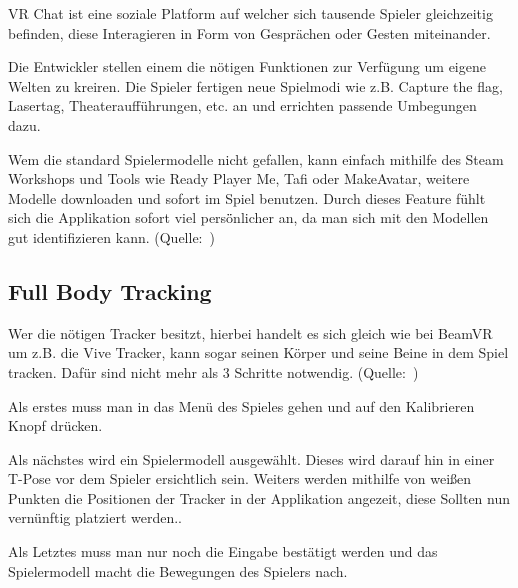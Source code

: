 VR Chat ist eine soziale Platform auf welcher sich tausende Spieler gleichzeitig befinden, diese Interagieren in Form von Gespr\"achen oder Gesten miteinander.

Die Entwickler stellen einem die n\"otigen Funktionen zur Verf\"ugung um eigene Welten zu kreiren. Die Spieler fertigen neue Spielmodi wie z.B. Capture the flag, Lasertag, Theaterauff\"uhrungen, etc. an und errichten passende Umbegungen dazu.

Wem die standard Spielermodelle nicht gefallen, kann einfach mithilfe des Steam Workshops und Tools wie Ready Player Me, Tafi oder MakeAvatar, weitere Modelle downloaden und sofort im Spiel benutzen.
Durch dieses Feature f\"uhlt sich die Applikation sofort viel pers\"önlicher an, da man sich mit den Modellen gut identifizieren kann.
(Quelle:~\cite{VRChat_2021_AvatarCreator})

\subsection{Full Body Tracking}
\label{sec:vrchat_fullbodytracking}
Wer die n\"otigen Tracker besitzt, hierbei handelt es sich gleich wie bei BeamVR um z.B. die Vive Tracker, kann sogar seinen K\"orper und seine Beine in dem Spiel tracken.
Dafür sind nicht mehr als 3 Schritte notwendig.
(Quelle:~\cite{VRChat_2021_FullBodyTracking})

Als erstes muss man in das Men\"u des Spieles gehen und auf den Kalibrieren Knopf dr\"ucken.

Als n\"achstes wird ein Spielermodell ausgew\"ahlt.
Dieses wird darauf hin in einer T-Pose vor dem Spieler ersichtlich sein.
Weiters werden mithilfe von weißen Punkten die Positionen der Tracker in der Applikation angezeit, diese Sollten nun vern\"unftig platziert werden..

Als Letztes muss man nur noch die Eingabe best\"atigt werden und das Spielermodell macht die Bewegungen des Spielers nach.

